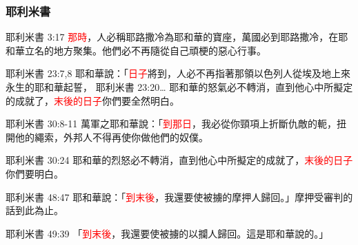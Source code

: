 \subsubsection{耶利米書}
耶利米書 3:17
\textcolor{red}{那時}，人必稱耶路撒冷為耶和華的寶座，萬國必到耶路撒冷，在耶和華立名的地方聚集。他們必不再隨從自己頑梗的惡心行事。

耶利米書 23:7,8
耶和華說：「\textcolor{red}{日子}將到，人必不再指著那領以色列人從埃及地上來永生的耶和華起誓，
耶利米書 23:20…
耶和華的怒氣必不轉消，直到他心中所擬定的成就了，\textcolor{red}{末後的日子}你們要全然明白。


耶利米書 30:8-11
萬軍之耶和華說：「\textcolor{red}{到那日}，我必從你頸項上折斷仇敵的軛，扭開他的繩索，外邦人不得再使你做他們的奴僕。

耶利米書 30:24
耶和華的烈怒必不轉消，直到他心中所擬定的成就了，\textcolor{red}{末後的日子}你們要明白。

耶利米書 48:47
耶和華說：「\textcolor{red}{到末後}，我還要使被擄的摩押人歸回。」摩押受審判的話到此為止。

耶利米書 49:39
「\textcolor{red}{到末後}，我還要使被擄的以攔人歸回。這是耶和華說的。」





